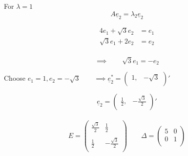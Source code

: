 \documentclass[11pt,a4paper]{article}
\theoremstyle{definition}
\begin{document}
For $\lambda = 1$
$$A\underline{e}_2 = \lambda_2 \underline{e}_2$$

\begin{align*}
4e_1 + \sqrt{3}e_2 & = e_1\\
\sqrt{3}e_1 + 2e_2 & = e_2\\
\end{align*}

$$\implies \qquad  \sqrt{3}e_1 = -e_2$$

Choose $e_1 =1,  e_2 = -\sqrt{3}\qquad  \implies \underline{e}^*_2 = \begin{pmatrix}
1, & -\sqrt{3}\\
\end{pmatrix}'$

$$\underline{e}_2 = \begin{pmatrix}
\frac{1}{2}, & -\frac{\sqrt{3}}{2}\\
\end{pmatrix}'$$\\


$$E = \begin{pmatrix}
\frac{\sqrt{3}}{2} & \frac{1}{2}\\\\
\frac{1}{2} & -\frac{\sqrt{3}}{2}\\
\end{pmatrix}\qquad 
\Delta = \begin{pmatrix}
5 & 0\\
0 & 1\\
\end{pmatrix}
$$\\
\end{document}
